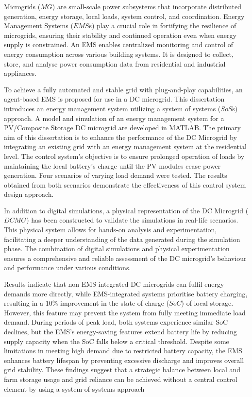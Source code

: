 Microgrids ($MG$) are small-scale power subsystems that incorporate distributed generation, energy storage, local loads, system control, and coordination. Energy Management Systems ($EMS$s) play a crucial role in fortifying the resilience of microgrids, ensuring their stability and continued operation even when energy supply is constrained. An EMS enables centralized monitoring and control of energy consumption across various building systems. It is designed to collect, store, and analyse power consumption data from residential and industrial appliances.
\par
To achieve a fully automated and stable grid with plug-and-play capabilities, an agent-based EMS is proposed for use in a DC microgrid. This dissertation introduces an energy management system utilizing a system of systems ($SoS$s) approach.  A model and simulation of an energy management system for a PV/Composite Storage DC microgrid are developed in MATLAB. The primary aim of this dissertation is to enhance the performance of the DC Microgrid by integrating an existing grid with an energy management system at the residential level. The control system's objective is to ensure prolonged operation of loads by maintaining the local battery's charge until the PV modules cease power generation. Four scenarios of varying load demand were tested. The results obtained from both scenarios demonstrate the effectiveness of this control system design approach.
\par
In addition to digital simulations, a physical representation of the DC Microgrid ($DC MG$) has been constructed to validate the simulations in real-life scenarios. This physical system allows for hands-on analysis and experimentation, facilitating a deeper understanding of the data generated during the simulation phase. The combination of digital simulations and physical experimentation ensures a comprehensive and reliable assessment of the DC microgrid's behaviour and performance under various conditions.
\par
Results indicate that non-EMS integrated DC microgrids can fulfil energy demands more directly, while EMS-integrated systems prioritise battery charging, resulting in a 10\% improvement in the state of charge ($SoC$) of local storage. However, this feature may prevent the system from fully meeting immediate load demand. During periods of peak load, both systems experience similar SoC declines, but the EMS's energy-saving features extend battery life by reducing supply capacity when the SoC falls below a critical threshold. Despite some limitations in meeting high demand due to restricted battery capacity, the EMS enhances battery lifespan by preventing excessive discharge and improves overall grid stability. These findings suggest that a strategic balance between local and farm storage usage and grid reliance can be achieved without a central control element by using a system-of-systems approach